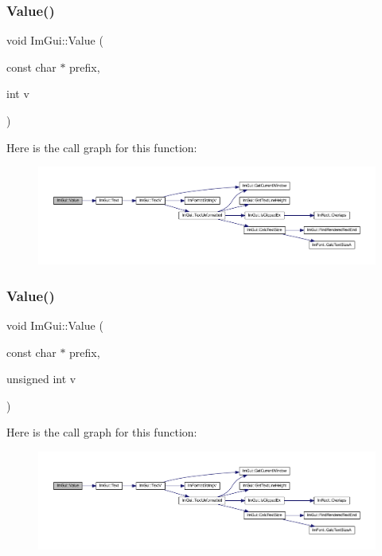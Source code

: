 \subsubsection{\texorpdfstring{Value()}{Value()}\hspace{0.1cm}{\footnotesize\ttfamily [2/4]}}
{\footnotesize\ttfamily void Im\+Gui\+::\+Value (\begin{DoxyParamCaption}\item[{const char $\ast$}]{prefix,  }\item[{int}]{v }\end{DoxyParamCaption})}

Here is the call graph for this function\+:
\nopagebreak
\begin{figure}[H]
\begin{center}
\leavevmode
\includegraphics[width=350pt]{namespace_im_gui_a654ceb70f2dd1598f88861f54764ee08_cgraph}
\end{center}
\end{figure}
\mbox{\label{namespace_im_gui_aec80a3e35bf7c1ff5704334e5a3ebd5a}} 
\subsubsection{\texorpdfstring{Value()}{Value()}\hspace{0.1cm}{\footnotesize\ttfamily [3/4]}}
{\footnotesize\ttfamily void Im\+Gui\+::\+Value (\begin{DoxyParamCaption}\item[{const char $\ast$}]{prefix,  }\item[{unsigned int}]{v }\end{DoxyParamCaption})}

Here is the call graph for this function\+:
\nopagebreak
\begin{figure}[H]
\begin{center}
\leavevmode
\includegraphics[width=350pt]{namespace_im_gui_aec80a3e35bf7c1ff5704334e5a3ebd5a_cgraph}
\end{center}
\end{figure}
\mbox{\label{namespace_im_gui_a0c8b87438082a1d0a46ae2a76090ca16}} 
